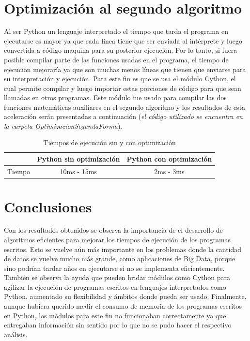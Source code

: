 \documentclass[12pt]{article}
\begin{document}
\section{Optimización al segundo algoritmo}
Al ser Python un lenguaje interpretado el tiempo que tarda el programa en ejecutarse es mayor ya que cada línea tiene que ser enviada al intérprete y luego convertida a código maquina
para su posterior ejecución. Por lo tanto, si fuera posible compilar parte de las funciones usadas en el programa, el tiempo de ejecución mejoraría ya que son muchas menos líneas
que tienen que enviarse para su interpretación y ejecución. Para este fin es que se usa el módulo Cython, el cual permite compilar y luego importar estas porciones de código para
que sean llamadas en otros programas. Este módulo fue usado para compilar las dos funciones matemáticas auxiliares en el segundo algoritmo y los resultados de esta aceleración
serán presentadas a continuación (\textit{el código utilizado se encuentra en la carpeta OptimizacionSegundaForma}).

\begin{table}[H]
   \centering
   \caption{Tiempos de ejecución sin y con optimización \protect\footnotemark[\value{footnote}]}
   \begin{tabular}{ccc}
      & Python sin optimización & Python con optimización\\
      \hline
      Tiempo & 10ms - 15ms & 2ms - 3ms\\
   \end{tabular}
\end{table}

\section{Conclusiones}
Con los resultados obtenidos se observa la importancia de el desarrollo de algoritmos eficientes para mejorar los tiempos de ejecución de los programas escritos. Esto se vuelve
aún más importante en los problemas donde la cantidad de datos se vuelve mucho más grande, como aplicaciones de Big Data, porque sino podrían tardar años en ejecutarse si no
se implementa eficientemente. También se observa la ayuda que pueden bridar módulos como Cython para agilizar la ejecución de programas escritos en lenguajes interpretados como
Python, aumentado su flexibilidad y ámbitos donde pueda ser usado. Finalmente, aunque hubiera querido medir el consumo de memoria de los programas escritos en Python, los módulos
para este fin no funcionaban correctamente ya que entregaban información sin sentido por lo que no se pudo hacer el respectivo análisis.
\end{document}
